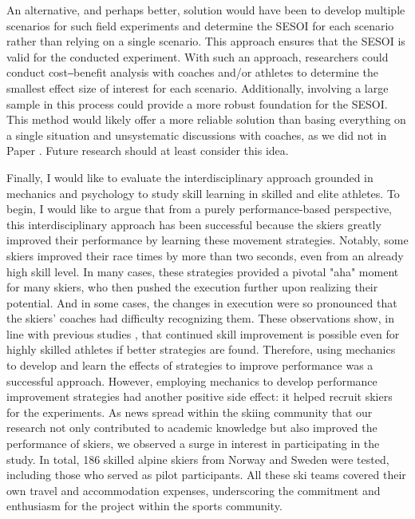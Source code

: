 An alternative, and perhaps better, solution would have been to develop multiple scenarios for such field experiments and determine the SESOI for each scenario rather than relying on a single scenario. This approach ensures that the SESOI is valid for the conducted experiment. With such an approach, researchers could conduct cost‒benefit analysis \parencite{anvari_using_2021} with coaches and/or athletes to determine the smallest effect size of interest for each scenario. Additionally, involving a large sample in this process could provide a more robust foundation for the SESOI. This method would likely offer a more reliable solution than basing everything on a single situation and unsystematic discussions with coaches, as we did not in Paper . Future research should at least consider this idea. 

Finally, I would like to evaluate the interdisciplinary approach grounded in mechanics and psychology to study skill learning in skilled and elite athletes. To begin, I would like to argue that from a purely performance-based perspective, this interdisciplinary approach has been successful because the skiers greatly improved their performance by learning these movement strategies. Notably, some skiers improved their race times by more than two seconds, even from an already high skill level. In many cases, these strategies provided a pivotal "aha" moment for many skiers, who then pushed the execution further upon realizing their potential. And in some cases, the changes in execution were so pronounced that the skiers' coaches had difficulty recognizing them. These observations show, in line with previous studies \parencite{ericsson_exceptional_1982, chase_skill_1982, grayshort, grayloooooong}, that continued skill improvement is possible even for highly skilled athletes if better strategies are found. Therefore, using mechanics to develop and learn the effects of strategies to improve performance was a successful approach. However, employing mechanics to develop performance improvement strategies had another positive side effect: it helped recruit skiers for the experiments. As news spread within the skiing community that our research not only contributed to academic knowledge but also improved the performance of skiers, we observed a surge in interest in participating in the study. In total, 186 skilled alpine skiers from Norway and Sweden were tested, including those who served as pilot participants. All these ski teams covered their own travel and accommodation expenses, underscoring the commitment and enthusiasm for the project within the sports community.

